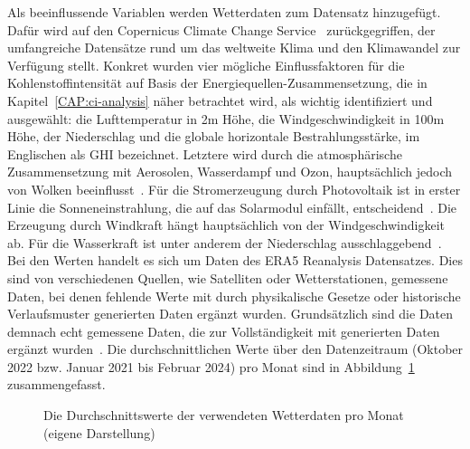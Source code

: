 Als beeinflussende Variablen werden Wetterdaten zum Datensatz hinzugefügt.
Dafür wird auf den Copernicus Climate Change Service~\cite{Copernicus.20231212T14:09:40.000Z} zurückgegriffen, der umfangreiche Datensätze rund um das weltweite Klima und den Klimawandel zur Verfügung stellt.
Konkret wurden vier mögliche Einflussfaktoren für die Kohlenstoffintensität auf Basis der Energiequellen-Zusammensetzung, die in Kapitel~\ref{CAP:ci-analysis} näher betrachtet wird, als wichtig identifiziert und ausgewählt:
die Lufttemperatur in 2m Höhe, die Windgeschwindigkeit in 100m Höhe, der Niederschlag und die globale horizontale Bestrahlungsstärke, im Englischen als \ac{GHI} bezeichnet.
Letztere wird durch die atmosphärische Zusammensetzung mit Aerosolen, Wasserdampf und Ozon, hauptsächlich jedoch von Wolken beeinflusst~\cite{KallioMyers.2020}.
Für die Stromerzeugung durch Photovoltaik ist in erster Linie die Sonneneinstrahlung, die auf das Solarmodul einfällt, entscheidend~\cite{James.}.
Die Erzeugung durch Windkraft hängt hauptsächlich von der Windgeschwindigkeit ab.
Für die Wasserkraft ist unter anderem der Niederschlag ausschlaggebend~\cite{Copernicus.20231212T14:09:40.000Z}.
Bei den Werten handelt es sich um Daten des ERA5 Reanalysis Datensatzes.
Dies sind von verschiedenen Quellen, wie Satelliten oder Wetterstationen, gemessene Daten, bei denen fehlende Werte mit durch physikalische Gesetze oder historische Verlaufsmuster generierten Daten ergänzt wurden.
Grundsätzlich sind die Daten demnach echt gemessene Daten, die zur Vollständigkeit mit generierten Daten ergänzt wurden~\cite{CopernicusClimateChangeService.2020}\cite{CopernicusKnowledgeBase.20231009}.
Die durchschnittlichen Werte über den Datenzeitraum (Oktober 2022 bzw. Januar 2021 bis Februar 2024) pro Monat sind in Abbildung~\ref{FIG:weather-data-by-month} zusammengefasst.
\begin{figure}[ht]
 \centering
 \par\medskip
 \caption[Durchschnittswerte der Wetterdaten]{Die Durchschnittswerte der verwendeten Wetterdaten pro Monat (eigene Darstellung)}%
 \label{FIG:weather-data-by-month}%
\end{figure}
